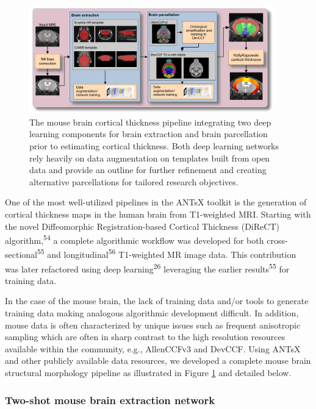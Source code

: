 \documentclass[
  12pt,
]{article}
\begin{document}
\begin{figure}
\centering
\includegraphics[width=0.95\textwidth]{Figures/mousePipeline.pdf}
\caption{The mouse brain cortical thickness pipeline integrating two 
deep learning components for brain extraction and brain parcellation 
prior to estimating cortical thickness. Both deep learning networks
rely heavily on data augmentation on templates built from open 
data and provide an outline for further refinement and creating 
alternative parcellations for tailored research objectives.}
\label{fig:mouseKK}
\end{figure}

One of the most well-utilized pipelines in the ANTsX toolkit is the
generation of cortical thickness maps in the human brain from
T1-weighted MRI. Starting with the novel Diffeomorphic
Registration-based Cortical Thickness (DiReCT)
algorithm,\textsuperscript{54} a complete algorithmic workflow was
developed for both cross-sectional\textsuperscript{55} and
longitudinal\textsuperscript{56} T1-weighted MR image data. This
contribution was later refactored using deep
learning\textsuperscript{26} leveraging the earlier
results\textsuperscript{55} for training data.

In the case of the mouse brain, the lack of training data and/or tools
to generate training data making analogous algorithmic development
difficult. In addition, mouse data is often characterized by unique
issues such as frequent anisotropic sampling which are often in sharp
contrast to the high resolution resources available within the
community, e.g., AllenCCFv3 and DevCCF. Using ANTsX and other publicly
available data resources, we developed a complete mouse brain structural
morphology pipeline as illustrated in Figure \ref{fig:mouseKK} and
detailed below.

\hypertarget{two-shot-mouse-brain-extraction-network}{%
\subsubsection{Two-shot mouse brain extraction
network}\label{two-shot-mouse-brain-extraction-network}}
\end{document}
